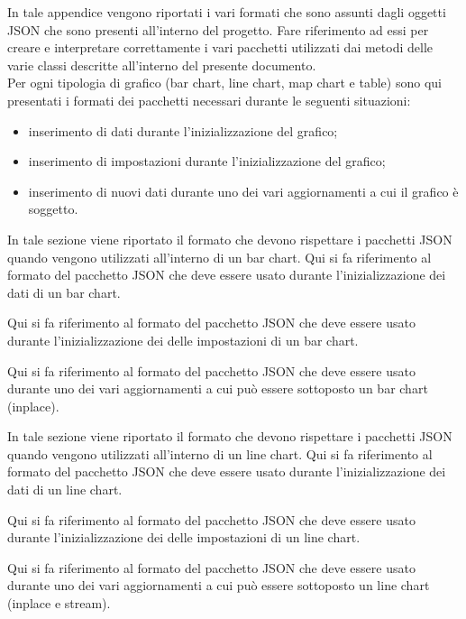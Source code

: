  \label{app:schemi}
    In tale appendice vengono riportati i vari formati che sono assunti dagli oggetti JSON che sono presenti all'interno del progetto. Fare riferimento ad essi per creare e interpretare correttamente i vari pacchetti utilizzati dai metodi delle varie classi descritte all'interno del presente documento.\\
    Per ogni tipologia di grafico (bar chart, line chart, map chart e table) sono qui presentati i formati dei pacchetti necessari durante le seguenti situazioni:
    \begin{itemize}
        \item inserimento di dati durante l'inizializzazione del grafico;
        \item inserimento di impostazioni durante l'inizializzazione del grafico;
        \item inserimento di nuovi dati durante uno dei vari aggiornamenti a cui il grafico è soggetto.
    \end{itemize}
        In tale sezione viene riportato il formato che devono rispettare i pacchetti JSON quando vengono utilizzati all'interno di un bar chart.
            Qui si fa riferimento al formato del pacchetto JSON che deve essere usato durante l'inizializzazione dei dati di un bar chart.
            
            Qui si fa riferimento al formato del pacchetto JSON che deve essere usato durante l'inizializzazione dei delle impostazioni di un bar chart.
            
            Qui si fa riferimento al formato del pacchetto JSON che deve essere usato durante uno dei vari aggiornamenti a cui può essere sottoposto un bar chart (inplace).
                

        In tale sezione viene riportato il formato che devono rispettare i pacchetti JSON quando vengono utilizzati all'interno di un line chart.
            Qui si fa riferimento al formato del pacchetto JSON che deve essere usato durante l'inizializzazione dei dati di un line chart.
            
            Qui si fa riferimento al formato del pacchetto JSON che deve essere usato durante l'inizializzazione dei delle impostazioni di un line chart.
            
            Qui si fa riferimento al formato del pacchetto JSON che deve essere usato durante uno dei vari aggiornamenti a cui può essere sottoposto un line chart (inplace e stream).
                
                

